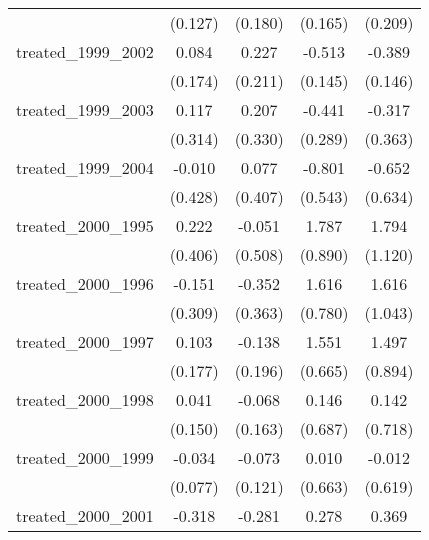 {\begin{tabular}{l*{4}{c}}
            &     (0.127)         &     (0.180)         &     (0.165)         &     (0.209)         \\
[1em]
treated\_1999\_2002&       0.084         &       0.227         &      -0.513\sym{***}&      -0.389\sym{**} \\
            &     (0.174)         &     (0.211)         &     (0.145)         &     (0.146)         \\
[1em]
treated\_1999\_2003&       0.117         &       0.207         &      -0.441         &      -0.317         \\
            &     (0.314)         &     (0.330)         &     (0.289)         &     (0.363)         \\
[1em]
treated\_1999\_2004&      -0.010         &       0.077         &      -0.801         &      -0.652         \\
            &     (0.428)         &     (0.407)         &     (0.543)         &     (0.634)         \\
[1em]
treated\_2000\_1995&       0.222         &      -0.051         &       1.787\sym{*}  &       1.794         \\
            &     (0.406)         &     (0.508)         &     (0.890)         &     (1.120)         \\
[1em]
treated\_2000\_1996&      -0.151         &      -0.352         &       1.616\sym{*}  &       1.616         \\
            &     (0.309)         &     (0.363)         &     (0.780)         &     (1.043)         \\
[1em]
treated\_2000\_1997&       0.103         &      -0.138         &       1.551\sym{*}  &       1.497         \\
            &     (0.177)         &     (0.196)         &     (0.665)         &     (0.894)         \\
[1em]
treated\_2000\_1998&       0.041         &      -0.068         &       0.146         &       0.142         \\
            &     (0.150)         &     (0.163)         &     (0.687)         &     (0.718)         \\
[1em]
treated\_2000\_1999&      -0.034         &      -0.073         &       0.010         &      -0.012         \\
            &     (0.077)         &     (0.121)         &     (0.663)         &     (0.619)         \\
[1em]
treated\_2000\_2001&      -0.318\sym{***}&      -0.281\sym{*}  &       0.278         &       0.369         \\

\end{tabular}}
